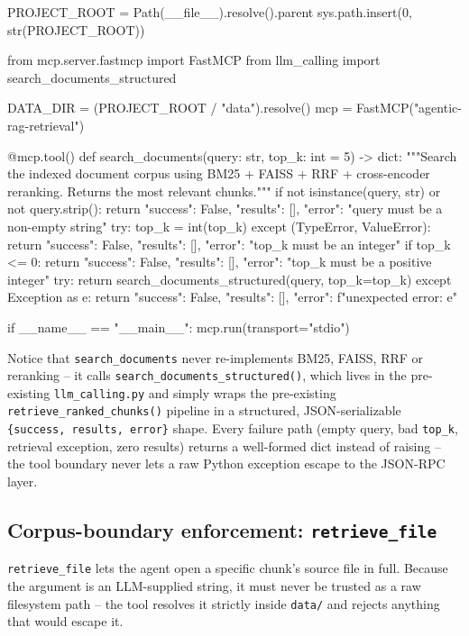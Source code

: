 \documentclass[11pt,a4paper]{article}
\begin{document}
\begin{pycode}
PROJECT_ROOT = Path(__file__).resolve().parent
sys.path.insert(0, str(PROJECT_ROOT))

from mcp.server.fastmcp import FastMCP
from llm_calling import search_documents_structured

DATA_DIR = (PROJECT_ROOT / "data").resolve()
mcp = FastMCP("agentic-rag-retrieval")

@mcp.tool()
def search_documents(query: str, top_k: int = 5) -> dict:
    """Search the indexed document corpus using BM25 + FAISS + RRF
    + cross-encoder reranking. Returns the most relevant chunks."""
    if not isinstance(query, str) or not query.strip():
        return {"success": False, "results": [], "error": "query must be a non-empty string"}
    try:
        top_k = int(top_k)
    except (TypeError, ValueError):
        return {"success": False, "results": [], "error": "top_k must be an integer"}
    if top_k <= 0:
        return {"success": False, "results": [], "error": "top_k must be a positive integer"}
    try:
        return search_documents_structured(query, top_k=top_k)
    except Exception as e:
        return {"success": False, "results": [], "error": f"unexpected error: {e}"}

if __name__ == "__main__":
    mcp.run(transport="stdio")
\end{pycode}

Notice that \texttt{search\_documents} never re-implements BM25, FAISS,
RRF or reranking -- it calls \texttt{search\_documents\_structured()},
which lives in the pre-existing \texttt{llm\_calling.py} and simply wraps
the pre-existing \texttt{retrieve\_ranked\_chunks()} pipeline in a
structured, JSON-serializable \texttt{\{success, results, error\}} shape.
Every failure path (empty query, bad \texttt{top\_k}, retrieval exception,
zero results) returns a well-formed dict instead of raising -- the tool
boundary never lets a raw Python exception escape to the JSON-RPC layer.

\subsection{Corpus-boundary enforcement: \texttt{retrieve\_file}}

\texttt{retrieve\_file} lets the agent open a specific chunk's source file
in full. Because the argument is an LLM-supplied string, it must never be
trusted as a raw filesystem path -- the tool resolves it strictly inside
\texttt{data/} and rejects anything that would escape it.
\end{document}
